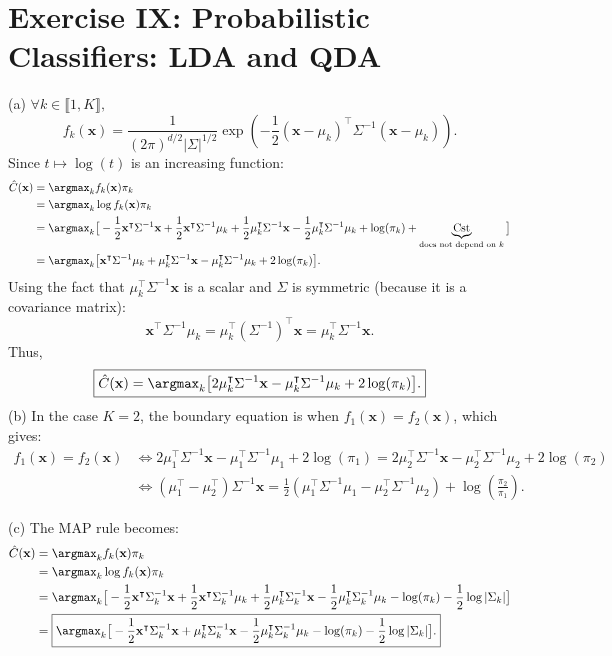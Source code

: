 \section{Exercise IX: Probabilistic Classifiers: LDA and QDA}

(a) $\forall k \in \llbracket 1, K \rrbracket,$
\[
    f_k(\mathbf{x}) = \frac{1}{(2\pi)^{d/2}|\Sigma|^{1/2}} \exp(-\frac{1}{2}(\mathbf{x} - \mu_k)^\intercal \Sigma^{-1} (\mathbf{x} - \mu_k)).
\]
Since $t \mapsto \log(t)$ is an increasing function:
\begin{align*}
    \hat{C}(\mathbf{x}) &= \argmax_k f_k(\mathbf{x})\pi_k \\
    &= \argmax_k \log f_k(\mathbf{x})\pi_k \\
    &= \argmax_k \big[- \frac{1}{2} \mathbf{x}^\intercal \Sigma^{-1} \mathbf{x} + \frac{1}{2}\mathbf{x}^\intercal\Sigma^{-1}\mu_k + \frac{1}{2}\mu_k^\intercal\Sigma^{-1}\mathbf{x} - \frac{1}{2}\mu_k^\intercal\Sigma^{-1}\mu_k + \log(\pi_k) + \underbrace{\text{Cst}}_{\substack{\text{does not depend on $k$}}} \big] \\
    &= \argmax_k \big[ \mathbf{x}^\intercal\Sigma^{-1}\mu_k + \mu_k^\intercal\Sigma^{-1}\mathbf{x} - \mu_k^\intercal\Sigma^{-1}\mu_k + 2\log(\pi_k)\big].
\end{align*}
Using the fact that $\mu_k^\intercal\Sigma^{-1}\mathbf{x}$ is a scalar and $\Sigma$ is symmetric (because it is a covariance matrix):
\[
    \mathbf{x}^\intercal\Sigma^{-1}\mu_k = \mu_k^\intercal(\Sigma^{-1})^\intercal \mathbf{x} = \mu_k^\intercal\Sigma^{-1}\mathbf{x}.
\]
Thus,
\[
    \boxed{
    \hat{C}(\mathbf{x}) =\argmax_k \big[ 2\mu_k^\intercal\Sigma^{-1}\mathbf{x} - \mu_k^\intercal\Sigma^{-1}\mu_k + 2\log(\pi_k)\big].
    }
\]
(b) In the case $K=2$, the boundary equation is when $f_1(\mathbf{x}) = f_2(\mathbf{x})$, which gives:
\begin{align*}
   f_1(\mathbf{x}) = f_2(\mathbf{x}) &\iff  2\mu_1^\intercal\Sigma^{-1}\mathbf{x} - \mu_1^\intercal\Sigma^{-1}\mu_1 + 2\log(\pi_1) = 2\mu_2^\intercal\Sigma^{-1}\mathbf{x} - \mu_2^\intercal\Sigma^{-1}\mu_2 + 2\log(\pi_2)\\
   &\iff \boxed{(\mu_1^\intercal - \mu_2^\intercal)\Sigma^{-1}\mathbf{x} = \frac{1}{2}(\mu_1^\intercal\Sigma^{-1}\mu_1 - \mu_2^\intercal\Sigma^{-1}\mu_2) + \log(\frac{\pi_2}{\pi_1}).}
\end{align*}

(c) The MAP rule becomes:
\begin{align*}
    \hat{C}(\mathbf{x}) &= \argmax_k f_k(\mathbf{x})\pi_k \\
    &= \argmax_k \log f_k(\mathbf{x})\pi_k \\
    &= \argmax_k \big[- \frac{1}{2} \mathbf{x}^\intercal \Sigma_k^{-1} \mathbf{x} + \frac{1}{2}\mathbf{x}^\intercal\Sigma_k^{-1}\mu_k + \frac{1}{2}\mu_k^\intercal\Sigma_k^{-1}\mathbf{x} - \frac{1}{2}\mu_k^\intercal\Sigma_k^{-1}\mu_k - \log(\pi_k) - \frac{1}{2}\log|\Sigma_k| \big] \\
    &= \boxed{\argmax_k \big[- \frac{1}{2} \mathbf{x}^\intercal \Sigma_k^{-1} \mathbf{x} + \mu_k^\intercal\Sigma_k^{-1}\mathbf{x} - \frac{1}{2}\mu_k^\intercal\Sigma_k^{-1}\mu_k - \log(\pi_k) - \frac{1}{2}\log|\Sigma_k| \big].}
\end{align*}

